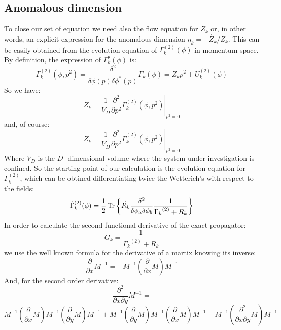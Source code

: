 \subsection{Anomalous dimension}
To close our set of equation we need also the flow equation for $Z_k$ or, in other words, an explicit expression for the anomalous dimension $\eta_k = -\dot{Z_k}/Z_k$.
This can be easily obtained from the evolution equation of $\Gamma^{(2)}_k(\phi)$ in momentum space. By definition, the expression of $\Gamma_k^{2}(\phi)$ is:
\begin{equation}
{\Gamma}^{(2)}_k(\phi, p^2) = \frac{\delta^2}{\delta \phi(p)\delta\phi^*(p)}{\Gamma}_k(\phi)=Z_kp^2 + U^{(2)}_k(\phi)
\end{equation}
So we have:
\begin{equation}
 Z_k = \frac{1}{V_D}\left.\frac{\partial^2}{\partial p^2}\Gamma_k^{(2)}(\phi, p^2)\right|_{p^2=0}
\end{equation}
and, of course:
\begin{equation}\label{zetaanomala}
 \dot{Z}_k = \frac{1}{V_D}\left.\frac{\partial^2}{\partial p^2}\dot{\Gamma}_k^{(2)}(\phi, p^2)\right|_{p^2=0}
\end{equation}
Where $V_D$ is the $D$- dimensional volume where the system under investigation is confined.
So the starting point of our calculation is the evolution equation for $\Gamma^{(2)}_k$, which can be obtined differentiating
twice the Wetterich's with respect to the fields:
\begin{equation}\label{punto?}
 \dot{\Gamma}_k^{(2)}(\phi) = \frac{1}{2}\operatorname{Tr}\left\{ \dot{R_k}\frac{\delta^2 }{\delta\phi_a\delta\phi_b}\frac{1}{{\Gamma_k}^{(2)} + R_k}\right\} 
\end{equation}
In order to calculate the second functional derivative of the exact propagator:
\begin{equation}
 G_k = \frac{1}{{\Gamma_k}^{(2)} + R_k}
\end{equation}
we use the well known formula for the derivative of a martix knowing its inverse:
\begin{equation}
 \frac{\partial}{\partial x} M^{-1} = - M^{-1}\left(\frac{\partial}{\partial x} M \right) M^{-1}
\end{equation}
And, for the second order derivative:
$$\frac{\partial^2}{\partial x\partial y} M^{-1} = $$
$$M^{-1}\left(\frac{\partial}{\partial x} M \right)M^{-1}\left(\frac{\partial}{\partial y} M \right) M^{-1} + M^{-1}\left(\frac{\partial}{\partial y} M \right)M^{-1}\left(\frac{\partial}{\partial x} M \right) M^{-1} -  M^{-1}\left(\frac{\partial^2}{\partial x\partial y} M \right) M^{-1}$$
